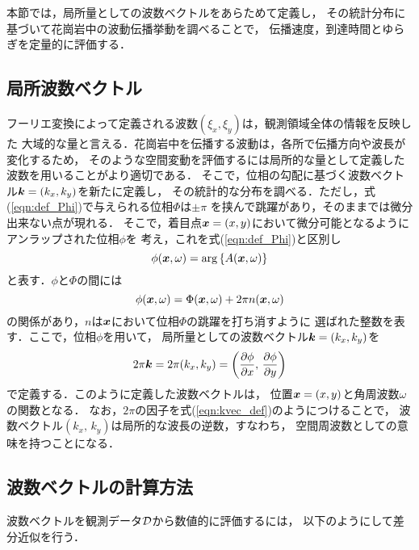 ﻿本節では，局所量としての波数ベクトルをあらためて定義し，
その統計分布に基づいて花崗岩中の波動伝播挙動を調べることで，
伝播速度，到達時間とゆらぎを定量的に評価する．
\subsection{局所波数ベクトル}
フーリエ変換によって定義される波数$(\xi_x,\xi_y)$は，観測領域全体の情報を反映した
大域的な量と言える．花崗岩中を伝播する波動は，各所で伝播方向や波長が変化するため，
そのような空間変動を評価するには局所的な量として定義した波数を用いることがより適切である．
そこで，位相の勾配に基づく波数ベクトル$\mbox{\boldmath{$k$}}=(k_x,k_y)$を新たに定義し，
その統計的な分布を調べる．ただし，式(\ref{eqn:def_Phi})で与えられる位相$\Phi$は$\pm \pi$
を挟んで跳躍があり，そのままでは微分出来ない点が現れる．
そこで，着目点$\mbox{\boldmath{$x$}}=(x,y)$において微分可能となるようにアンラップされた位相$\phi$を
考え，これを式(\ref{eqn:def_Phi})と区別し
\begin{equation}
	\phi(\fat{x},\omega)=\arg\left\{  A(\fat{x},\omega) \right\}
	\label{eqn:def_phi}
\end{equation}
と表す．$\phi$と$\Phi$の間には
\begin{equation}
	\phi(\fat{x},\omega)=\Phi(\fat{x},\omega) + 2\pi n(\fat{x},\omega )
	\label{eqn:unwrap}
\end{equation}
の関係があり，$n$は$\mbox{\boldmath{$x$}}$において位相$\Phi$の跳躍を打ち消すように
選ばれた整数を表す．ここで，位相$\phi$を用いて，
局所量としての波数ベクトル$\mbox{\boldmath{$k$}}=(k_x,k_y)$を
\begin{equation}
	2\pi \fat{k}= 
	2\pi (k_x,k_y)=
	\left(
		\frac{\partial \phi}{\partial x}
		, \, 
		\frac{\partial \phi}{\partial y} 
	\right)
	\label{eqn:kvec_def}
\end{equation}
で定義する．このように定義した波数ベクトルは，
位置$\mbox{\boldmath{$x$}}=(x,y)$と角周波数$\omega$の関数となる．
なお，$2\pi$の因子を式(\ref{eqn:kvec_def})のようにつけることで，
波数ベクトル$(k_x,\,k_y)$は局所的な波長の逆数，すなわち，
空間周波数としての意味を持つことになる．
\subsection{波数ベクトルの計算方法}
波数ベクトルを観測データ$\cal D$から数値的に評価するには，
以下のようにして差分近似を行う．

